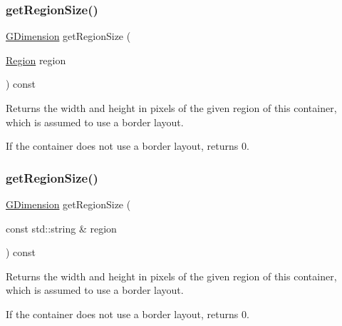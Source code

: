 \subsubsection{\texorpdfstring{get\+Region\+Size()}{getRegionSize()}\hspace{0.1cm}{\footnotesize\ttfamily [1/2]}}
{\footnotesize\ttfamily \mbox{\hyperlink{structGDimension}{G\+Dimension}} get\+Region\+Size (\begin{DoxyParamCaption}\item[{\mbox{\hyperlink{classGContainer_a81a01a86de31071a92e6cce0bab9bc4b}{Region}}}]{region }\end{DoxyParamCaption}) const\hspace{0.3cm}{\ttfamily [virtual]}}



Returns the width and height in pixels of the given region of this container, which is assumed to use a border layout. 

If the container does not use a border layout, returns 0. \mbox{\label{classGContainer_a68b18b38b72cb8779fca0c3882549a6b}} 
\subsubsection{\texorpdfstring{get\+Region\+Size()}{getRegionSize()}\hspace{0.1cm}{\footnotesize\ttfamily [2/2]}}
{\footnotesize\ttfamily \mbox{\hyperlink{structGDimension}{G\+Dimension}} get\+Region\+Size (\begin{DoxyParamCaption}\item[{const std\+::string \&}]{region }\end{DoxyParamCaption}) const\hspace{0.3cm}{\ttfamily [virtual]}}



Returns the width and height in pixels of the given region of this container, which is assumed to use a border layout. 

If the container does not use a border layout, returns 0. \mbox{\label{classGContainer_a96e2005c3f447a8679c3c32d3fc02de1}} 
